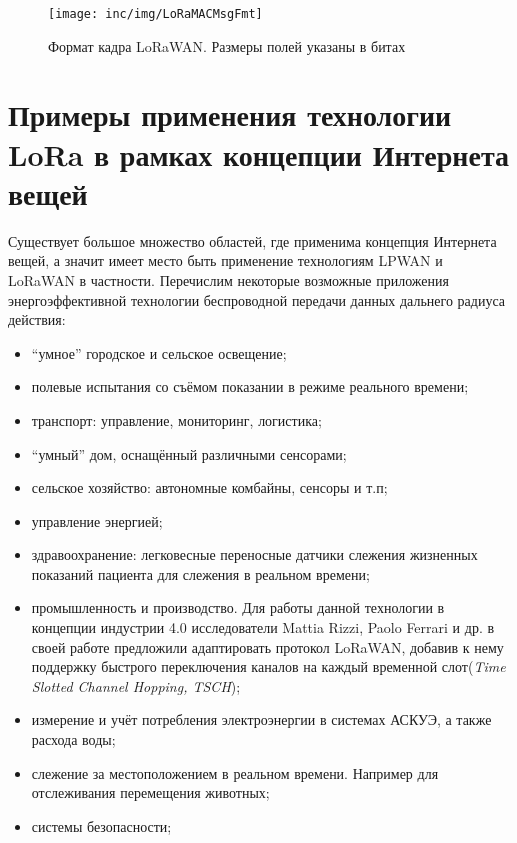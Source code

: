 \begin{figure}[!h]
  \centering
  \texttt{[image: inc/img/LoRaMACMsgFmt]}
  \caption{Формат кадра LoRaWAN. Размеры полей указаны в битах \cite{augustin2016}}
  \label{fig:macframe}
\end{figure}



\section{Примеры применения технологии LoRa в рамках концепции Интернета вещей}

Существует большое множество областей, где применима концепция Интернета вещей, а значит имеет место быть применение технологиям LPWAN и LoRaWAN в частности.
Перечислим некоторые возможные приложения энергоэффективной технологии беспроводной передачи данных дальнего радиуса действия:
\begin{itemize}
 \item ``умное'' городское и сельское освещение;
 \item полевые испытания со съёмом показании в режиме реального времени;
 \item транспорт: управление, мониторинг, логистика;
 \item ``умный'' дом, оснащённый различными сенсорами;
 \item сельское хозяйство: автономные комбайны, сенсоры и т.п;
 \item управление энергией;
 \item здравоохранение: легковесные переносные датчики слежения жизненных показаний пациента для слежения в реальном времени;
 \item промышленность и производство. Для работы данной технологии в концепции индустрии 4.0 исследователи Mattia Rizzi, Paolo Ferrari и др. в своей работе \cite{Rizzi2017} предложили адаптировать протокол LoRaWAN, добавив к нему поддержку быстрого переключения каналов на каждый временной слот(\textit{Time Slotted Channel Hopping, TSCH});
 \item измерение и учёт потребления электроэнергии в системах АСКУЭ, а также расхода воды;
 \item слежение за местоположением в реальном времени. Например для отслеживания перемещения животных; 
 \item системы безопасности; 
\end{itemize}


